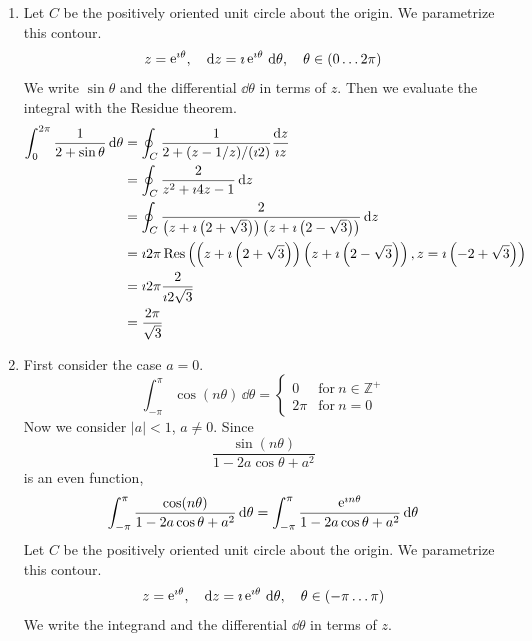 {%
\begin{Solution}
  \label{solution 1/(2 + sin theta)}
  \begin{enumerate}
  \item
    Let $C$ be the positively oriented unit circle about the origin.  We 
    parametrize this contour.
    \[
    z = \mathop{\mathrm{e}}\nolimits^{\imath \theta}, \quad \mathrm{d} z = \imath \mathop{\mathrm{e}}\nolimits^{\imath \theta} \,\mathrm{d} \theta, \quad \theta \in (0 \ldots 2 \pi)
    \]
    We write $\sin \theta$ and the differential $\dd \theta$ in terms of $z$.
    Then we evaluate the integral with the Residue theorem.
    \begin{align*}
      \int_0^{2 \pi} \frac{1}{2 + \sin \theta} \,\mathrm{d} \theta
      &= \oint_C \frac{1}{2 + (z - 1/z) / (\imath 2)}  \frac{\mathrm{d} z}{\imath z} \\
      &= \oint_C \frac{2}{z^2 + \imath 4 z - 1} \,\mathrm{d} z \\
      &= \oint_C \frac{2}{ \left(z + \imath \left(2 + \sqrt{3}\right)\right)
        \left(z + \imath \left(2 - \sqrt{3}\right)\right)} \,\mathrm{d} z \\
      &=  \imath 2 \pi \mathop{\mathrm{Res}}\nolimits \left( \left(z + \imath \left(2 + \sqrt{3}\right)\right)
        \left(z + \imath \left(2 - \sqrt{3}\right)\right),
        z = \imath \left(-2 + \sqrt{3}\right) \right) \\
      &= \imath 2 \pi \frac{2}{\imath 2 \sqrt{3}} \\
      &= \frac{2 \pi}{\sqrt{3}}
    \end{align*}
  \item
    First consider the case $a = 0$.  
    \[
    \int_{-\pi}^{\pi} \cos(n \theta) \,\dd \theta = 
    \begin{cases}
      0 &\mathrm{for}\ n \in \mathbb{Z}^+ \\
      2 \pi &\mathrm{for}\ n = 0
    \end{cases}
    \]
    Now we consider $|a| < 1$, $a \neq 0$.  Since
    \[
    \frac{\sin(n \theta)}{1 - 2 a \cos \theta + a^2}
    \]
    is an even function,
    \[
    \int_{-\pi}^{\pi}\frac{\cos(n \theta)}{1 - 2 a \cos \theta + a^2} \,\mathrm{d} \theta
    = \int_{-\pi}^{\pi}\frac{\mathop{\mathrm{e}}\nolimits^{\imath n \theta}}{1 - 2 a \cos \theta + a^2} \,\mathrm{d} \theta
    \]
    Let $C$ be the positively oriented unit circle about the origin.  We 
    parametrize this contour.
    \[
    z = \mathop{\mathrm{e}}\nolimits^{\imath \theta}, \quad \mathrm{d} z = \imath \mathop{\mathrm{e}}\nolimits^{\imath \theta} \,\mathrm{d} \theta, \quad \theta \in (-\pi \ldots \pi)
    \]
    We write the integrand and the differential $\dd \theta$ in terms of $z$.

\end{enumerate}
\end{Solution}}
